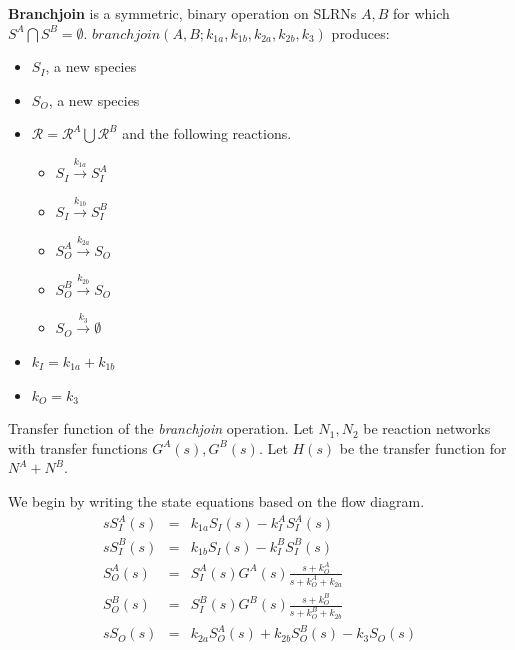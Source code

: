 \documentclass[unnumsec,webpdf,contemporary,large]{oup-authoring-template}%
\theoremstyle{thmstyleone}%
\theoremstyle{thmstyletwo}%
\theoremstyle{thmstylethree}%
\begin{document}
{\bf Branchjoin} is a symmetric, binary operation on SLRNs $A, B$ for which
$S^A \bigcap S^B = \emptyset$.
$branchjoin(A, B; k_{1a}, k_{1b}, k_{2a}, k_{2b}, k_3)$
produces:
\begin{itemize}
\item $S_I$, a new species
\item $S_O$, a new species
\item $\mathcal{R} = \mathcal{R}^A \bigcup \mathcal{R}^B$ and the following reactions.
\begin{itemize}
\item
$S_I \xrightarrow{k_{1a}} S^A_I$
\item $S_I \xrightarrow{k_{1b}} S^B_I$
\item
$S^A_O \xrightarrow{k_{2a}} S_O$
\item
$S^B_O \xrightarrow{k_{2b}} S_O$
\item
$S_O \xrightarrow{k_3} \emptyset$
\end{itemize}
\item $k_I = k_{1a} + k_{1b}$
\item $k_O = k_3$
\end{itemize}

Transfer function of the {\em branchjoin} operation.
Let $N_1, N_2$ be reaction networks with transfer functions $G^A(s), G^B(s)$. Let $H(s)$ be the transfer function for $N^A + N^B$.

We begin by writing the state equations based on the flow diagram.
   \begin{eqnarray}
   s S^A_I (s) & = & k_{1a} S_I(s) - k^A_I S^A_I (s) \nonumber \\
   s S^B_I (s) & = & k_{1b} S_I(s) - k^B_I S^B_I (s) \nonumber \\
   S^A_O (s) & = &  S^A_I (s) G^A(s) \frac{s + k^A_O}{s + k^A_O + k_{2a}} \nonumber \\
   S^B_O (s) & = & S^B_I (s)  G^B(s) \frac{s + k^B_O}{s + k^B_O + k_{2b}} \nonumber \\
   sS_O (s) & = & k_{2a} S^A_O(s) + k_{2b} S^B_O(s) - k_3 S_O(s)
   \end{eqnarray}
\end{document}
